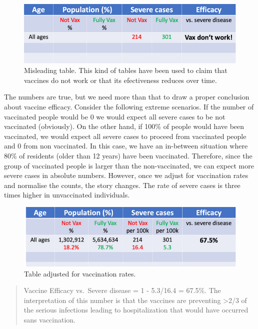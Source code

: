 \documentclass[
]{book}
\begin{document}
\begin{figure}

{\centering \includegraphics[width=0.7\linewidth]{Figures/vaccines-ex-fig1} 

}

\caption{Misleading table. This kind of tables have been used to claim that vaccines do not work or that its efectiveness reduces over time.}\label{fig:vaccine-rates-a}
\end{figure}

The numbers are true, but we need more than that to draw a proper conclusion about vaccine efficacy. Consider the following extreme scenarios. If the number of vaccinated people would be 0 we would expect all severe cases to be not vaccinated (obviously). On the other hand, if 100\% of people would have been vaccinated, we would expect all severe cases to proceed from vaccinated people and 0 from non vaccinated. In this case, we have an in-between situation where 80\% of residents (older than 12 years) have been vaccinated. Therefore, since the group of vaccinated people is larger than the non-vaccinated, we can expect more severe cases in absolute numbers. However, once we adjust for vaccination rates and normalise the counts, the story changes. The rate of severe cases is three times higher in unvaccinated individuals.

\begin{figure}

{\centering \includegraphics[width=0.7\linewidth]{Figures/vaccines-ex-fig2} 

}

\caption{Table adjusted for vaccination rates.}\label{fig:vaccine-rates-b}
\end{figure}

\begin{quote}
Vaccine Efficacy vs.~Severe disease = 1 - 5.3/16.4 = 67.5\%.
The interpretation of this number is that the vaccines are preventing \textgreater2/3 of the serious infections leading to hospitalization that would have occurred sans vaccination.
\end{quote}
\end{document}
